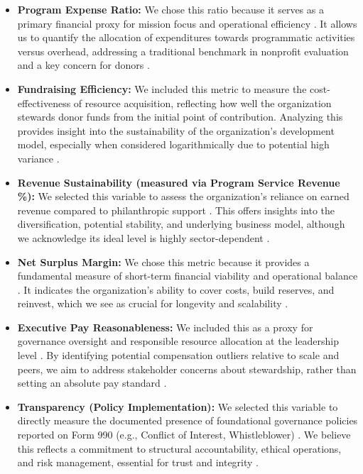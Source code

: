 \documentclass[12pt]{article}
\begin{document}
\begin{itemize}
\item \textbf{Program Expense Ratio:} We chose this ratio because it serves as a primary financial proxy for mission focus and operational efficiency \cite{Gregory2009}. It allows us to quantify the allocation of expenditures towards programmatic activities versus overhead, addressing a traditional benchmark in nonprofit evaluation and a key concern for donors \cite{progressnow}.
\item \textbf{Fundraising Efficiency:} We included this metric to measure the cost-effectiveness of resource acquisition, reflecting how well the organization stewards donor funds from the initial point of contribution. Analyzing this provides insight into the sustainability of the organization's development model, especially when considered logarithmically due to potential high variance \cite{project2024}.
\item \textbf{Revenue Sustainability (measured via Program Service Revenue \%):} We selected this variable to assess the organization's reliance on earned revenue compared to philanthropic support \cite{article}. This offers insights into the diversification, potential stability, and underlying business model, although we acknowledge its ideal level is highly sector-dependent \cite{propublica_inc}.
\item \textbf{Net Surplus Margin:} We chose this metric because it provides a fundamental measure of short-term financial viability and operational balance \cite{TRUSSEL2007263}. It indicates the organization's ability to cover costs, build reserves, and reinvest, which we see as crucial for longevity and scalability \cite{ntu}.
\item \textbf{Executive Pay Reasonableness:} We included this as a proxy for governance oversight and responsible resource allocation at the leadership level \cite{https://doi.org/10.1002/nml.21143}. By identifying potential compensation outliers relative to scale and peers, we aim to address stakeholder concerns about stewardship, rather than setting an absolute pay standard \cite{propublica_explorer}.
\item \textbf{Transparency (Policy Implementation):} We selected this variable to directly measure the documented presence of foundational governance policies reported on Form 990 (e.g., Conflict of Interest, Whistleblower) \cite{lecy_nonprofit_2012}. We believe this reflects a commitment to structural accountability, ethical operations, and risk management, essential for trust and integrity \cite{propublica_search}.
\end{itemize}
\end{document}
